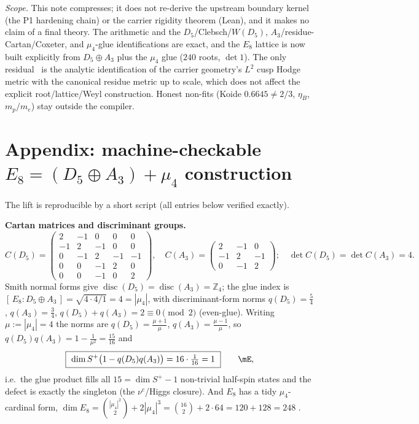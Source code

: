 \documentclass[11pt,a4paper]{article}
\theoremstyle{definition}
\begin{document}
\noindent\emph{Scope.} This note compresses; it does not re-derive the upstream boundary kernel
(the P1 hardening chain) or the carrier rigidity theorem (Lean), and it makes no claim of a final theory. The
arithmetic and the $D_5$/Clebsch/$W(D_5)$, $A_3$/residue-Cartan/Coxeter, and $\mu_4$-glue
identifications are exact, and the $E_8$ lattice is now built explicitly from $D_5\oplus A_3$ plus the
$\mu_4$ glue ($240$ roots, $\det1$). The only residual \mC\ is the analytic identification of the carrier geometry's
$L^2$ cusp Hodge metric with the canonical residue metric up to scale, which does not affect the
explicit root/lattice/Weyl construction. Honest non-fits (Koide $0.6645\neq2/3$, $\eta_B$, $m_p/m_e$)
stay outside the compiler.

\section*{Appendix: machine-checkable $E_8=(D_5\oplus A_3)+\mu_4$ construction}
The lift is reproducible by a short script (all entries below verified exactly).

\smallskip
\noindent\textbf{Cartan matrices and discriminant groups.}
\[
  C(D_5)=\begin{pmatrix}2&-1&0&0&0\\-1&2&-1&0&0\\0&-1&2&-1&-1\\0&0&-1&2&0\\0&0&-1&0&2\end{pmatrix},\quad
  C(A_3)=\begin{pmatrix}2&-1&0\\-1&2&-1\\0&-1&2\end{pmatrix};\quad
  \det C(D_5)=\det C(A_3)=4 .
\]
Smith normal forms give $\operatorname{disc}(D_5)=\operatorname{disc}(A_3)=\mathbb Z_4$; the glue index is
$[\,E_8:D_5\oplus A_3\,]=\sqrt{4\cdot4/1}=4=|\mu_4|$, with discriminant-form norms $q(D_5)=\tfrac54$,
$q(A_3)=\tfrac34$, $q(D_5)+q(A_3)=2\equiv0\pmod 2$ (even-glue). Writing $\mu:=|\mu_4|=4$ the norms are
$q(D_5)=\tfrac{\mu+1}{\mu}$, $q(A_3)=\tfrac{\mu-1}{\mu}$, so $q(D_5)q(A_3)=1-\tfrac1{\mu^2}=\tfrac{15}{16}$ and
\begin{equation}
  \boxed{\ \dim S^+\bigl(1-q(D_5)q(A_3)\bigr)=16\cdot\tfrac1{16}=1\ }\qquad\mE ,
\end{equation}
i.e.\ the glue product fills all $15=\dim S^+{-}1$ non-trivial half-spin states and the defect is exactly
the singleton (the $\nu^c$/Higgs closure). And $E_8$ has a tidy $\mu_4$-cardinal form,
$\dim E_8=\binom{|\mu_4|^2}{2}+2|\mu_4|^3=\binom{16}{2}+2\cdot64=120+128=248$ \mC.
\end{document}
